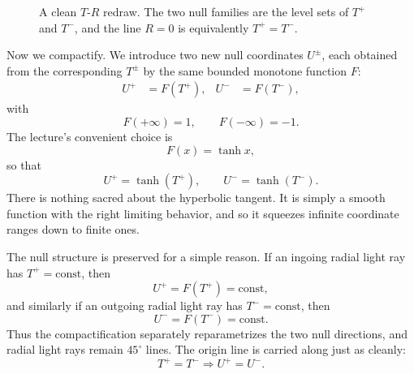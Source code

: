 \begin{figure}[htbp]
\centering
{}
\caption{A clean \(T\)-\(R\) redraw. The two null families are the level sets of \(T^+\) and \(T^-\), and the line \(R=0\) is equivalently \(T^+=T^-\).}
\end{figure}

Now we compactify. We introduce two new null coordinates \(U^\pm\), each obtained from the corresponding \(T^\pm\) by the same bounded monotone function \(F\):
\begin{align}
U^+ &= F(T^+), &
U^- &= F(T^-),
\end{align}
with
\begin{equation}
F(+\infty)=1,
\qquad
F(-\infty)=-1.
\end{equation}
The lecture's convenient choice is
\begin{equation}
F(x)=\tanh x,
\end{equation}
so that
\begin{equation}
U^+ = \tanh(T^+),
\qquad
U^- = \tanh(T^-).
\end{equation}
There is nothing sacred about the hyperbolic tangent. It is simply a smooth function with the right limiting behavior, and so it squeezes infinite coordinate ranges down to finite ones.

The null structure is preserved for a simple reason. If an ingoing radial light ray has \(T^+=\text{const}\), then
\[
U^+=F(T^+)=\text{const},
\]
and similarly if an outgoing radial light ray has \(T^-=\text{const}\), then
\[
U^-=F(T^-)=\text{const}.
\]
Thus the compactification separately reparametrizes the two null directions, and radial light rays remain \(45^\circ\) lines. The origin line is carried along just as cleanly:
\[
T^+=T^- \Longrightarrow U^+=U^-.
\]

